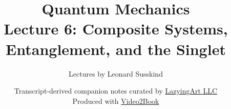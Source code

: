 \documentclass[11pt,oneside]{book}
\begin{document}
\frontmatter
\title{Quantum Mechanics\\[0.5em]\large Lecture 6: Composite Systems, Entanglement, and the Singlet}
\author{Lectures by Leonard Susskind}
\date{Transcript-derived companion notes curated by \href{https://lazying.art}{LazyingArt LLC}\\Produced with \href{https://github.com/lachlanchen/Video2Book}{Video2Book}}
\maketitle
\mainmatter

\end{document}
